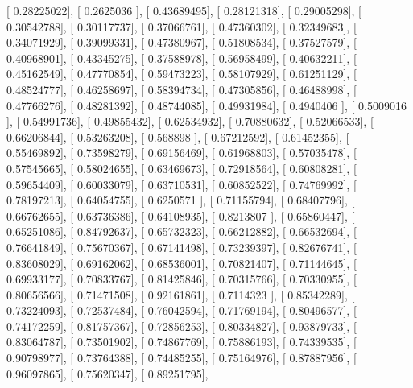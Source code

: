 \documentclass{article}
\begin{document}
       [ 0.28225022],
       [ 0.2625036 ],
       [ 0.43689495],
       [ 0.28121318],
       [ 0.29005298],
       [ 0.30542788],
       [ 0.30117737],
       [ 0.37066761],
       [ 0.47360302],
       [ 0.32349683],
       [ 0.34071929],
       [ 0.39099331],
       [ 0.47380967],
       [ 0.51808534],
       [ 0.37527579],
       [ 0.40968901],
       [ 0.43345275],
       [ 0.37588978],
       [ 0.56958499],
       [ 0.40632211],
       [ 0.45162549],
       [ 0.47770854],
       [ 0.59473223],
       [ 0.58107929],
       [ 0.61251129],
       [ 0.48524777],
       [ 0.46258697],
       [ 0.58394734],
       [ 0.47305856],
       [ 0.46488998],
       [ 0.47766276],
       [ 0.48281392],
       [ 0.48744085],
       [ 0.49931984],
       [ 0.4940406 ],
       [ 0.5009016 ],
       [ 0.54991736],
       [ 0.49855432],
       [ 0.62534932],
       [ 0.70880632],
       [ 0.52066533],
       [ 0.66206844],
       [ 0.53263208],
       [ 0.568898  ],
       [ 0.67212592],
       [ 0.61452355],
       [ 0.55469892],
       [ 0.73598279],
       [ 0.69156469],
       [ 0.61968803],
       [ 0.57035478],
       [ 0.57545665],
       [ 0.58024655],
       [ 0.63469673],
       [ 0.72918564],
       [ 0.60808281],
       [ 0.59654409],
       [ 0.60033079],
       [ 0.63710531],
       [ 0.60852522],
       [ 0.74769992],
       [ 0.78197213],
       [ 0.64054755],
       [ 0.6250571 ],
       [ 0.71155794],
       [ 0.68407796],
       [ 0.66762655],
       [ 0.63736386],
       [ 0.64108935],
       [ 0.8213807 ],
       [ 0.65860447],
       [ 0.65251086],
       [ 0.84792637],
       [ 0.65732323],
       [ 0.66212882],
       [ 0.66532694],
       [ 0.76641849],
       [ 0.75670367],
       [ 0.67141498],
       [ 0.73239397],
       [ 0.82676741],
       [ 0.83608029],
       [ 0.69162062],
       [ 0.68536001],
       [ 0.70821407],
       [ 0.71144645],
       [ 0.69933177],
       [ 0.70833767],
       [ 0.81425846],
       [ 0.70315766],
       [ 0.70330955],
       [ 0.80656566],
       [ 0.71471508],
       [ 0.92161861],
       [ 0.7114323 ],
       [ 0.85342289],
       [ 0.73224093],
       [ 0.72537484],
       [ 0.76042594],
       [ 0.71769194],
       [ 0.80496577],
       [ 0.74172259],
       [ 0.81757367],
       [ 0.72856253],
       [ 0.80334827],
       [ 0.93879733],
       [ 0.83064787],
       [ 0.73501902],
       [ 0.74867769],
       [ 0.75886193],
       [ 0.74339535],
       [ 0.90798977],
       [ 0.73764388],
       [ 0.74485255],
       [ 0.75164976],
       [ 0.87887956],
       [ 0.96097865],
       [ 0.75620347],
       [ 0.89251795],
\end{document}

